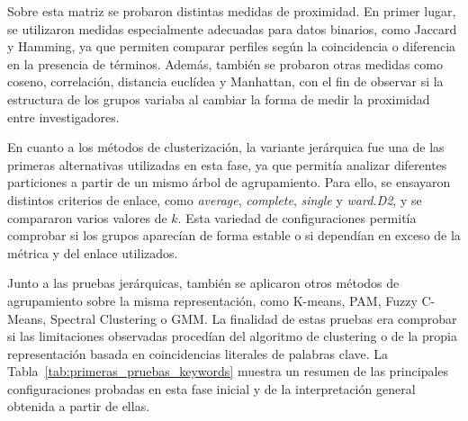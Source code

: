 \documentclass[11pt,spanish,listoffigures,listoftables]{tfgetsinf}
\begin{document}
Sobre esta matriz se probaron distintas medidas de proximidad. En primer lugar, se utilizaron medidas especialmente adecuadas para datos binarios, como Jaccard y Hamming, ya que permiten comparar perfiles según la coincidencia o diferencia en la presencia de términos. Además, también se probaron otras medidas como coseno, correlación, distancia euclídea y Manhattan, con el fin de observar si la estructura de los grupos variaba al cambiar la forma de medir la proximidad entre investigadores.

En cuanto a los métodos de clusterización, la variante jerárquica fue una de las primeras alternativas utilizadas en esta fase, ya que permitía analizar diferentes particiones a partir de un mismo árbol de agrupamiento. Para ello, se ensayaron distintos criterios de enlace, como \textit{average}, \textit{complete}, \textit{single} y \textit{ward.D2}, y se compararon varios valores de \(k\). Esta variedad de configuraciones permitía comprobar si los grupos aparecían de forma estable o si dependían en exceso de la métrica y del enlace utilizados.

Junto a las pruebas jerárquicas, también se aplicaron otros métodos de agrupamiento sobre la misma representación, como K-means, PAM, Fuzzy C-Means, Spectral Clustering o GMM. La finalidad de estas pruebas era comprobar si las limitaciones observadas procedían del algoritmo de clustering o de la propia representación basada en coincidencias literales de palabras clave. La Tabla~\ref{tab:primeras_pruebas_keywords} muestra un resumen de las principales configuraciones probadas en esta fase inicial y de la interpretación general obtenida a partir de ellas.
\end{document}
